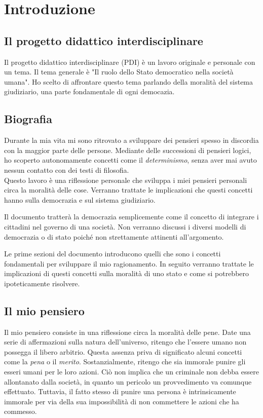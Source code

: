 \documentclass[a4paper, 12pt]{article}
\begin{document}
\pagebreak

\tableofcontents
\pagebreak

\section{Introduzione}

\subsection{Il progetto didattico interdisciplinare}

Il progetto didattico interdisciplinare (PDI) è un lavoro originale e personale
con un tema. Il tema generale è "Il ruolo dello Stato democratico nella società umana".
Ho scelto di affrontare questo tema parlando della moralità del sistema giudiziario,
una parte fondamentale di ogni democazia.

\subsection{Biografia}

Durante la mia vita mi sono ritrovato a sviluppare dei pensieri
spesso in discordia con la maggior parte delle persone.
Mediante delle successioni di pensieri logici, ho scoperto autonomamente concetti
come il \textit{determinismo}, senza aver mai avuto nessun contatto con dei testi di filosofia.
\\
Questo lavoro è una riflessione personale che sviluppa i miei pensieri
personali circa la moralità delle cose. Verranno trattate le implicazioni
che questi concetti hanno sulla democrazia e sul sistema giudiziario.

Il documento tratterà la democrazia semplicemente come il concetto di integrare i cittadini
nel governo di una società. Non verranno discussi i diversi modelli di democrazia o di stato
poiché non strettamente attinenti all'argomento.

Le prime sezioni del documento introducono quelli che sono i concetti fondamentali per
sviluppare il mio ragionamento. In seguito verranno trattate
le implicazioni di questi concetti sulla moralità di uno stato e come si potrebbero
ipoteticamente risolvere.

\subsection{Il mio pensiero}

Il mio pensiero consiste in una riflessione circa la moralità delle pene.
Date una serie di affermazioni sulla natura dell'universo, ritengo che l'essere umano
non possegga il libero arbitrio. Questa assenza priva di significato alcuni concetti come la
\textit{pena} o il \textit{merito}. Sostanzialmente, ritengo che sia immorale punire gli esseri
umani per le loro azioni. Ciò non implica che un criminale non debba essere allontanato dalla società,
in quanto un pericolo un provvedimento va comunque effettuato. Tuttavia,
il fatto stesso di punire una persona è intrinsicamente immorale per via
della sua impossibilità di non commettere le azioni che ha commesso.
\end{document}
